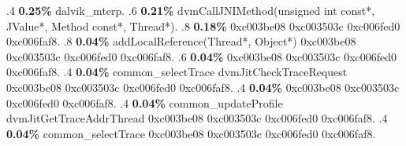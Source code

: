 \begin{profile}
{.4 \textbf{0.25\%} dalvik\_mterp. 
.6 \textbf{0.21\%} dvmCallJNIMethod(unsigned int const*, JValue*, Method const*, Thread*). 
.8 \textbf{0.18\%} 0xc003be08\newline {} 0xc003503c\newline {} 0xc006fed0\newline {} 0xc006faf8. 
.8 \textbf{0.04\%} addLocalReference(Thread*, Object*)\newline {} 0xc003be08\newline {} 0xc003503c\newline {} 0xc006fed0\newline {} 0xc006faf8. 
.6 \textbf{0.04\%} 0xc003be08\newline {} 0xc003503c\newline {} 0xc006fed0\newline {} 0xc006faf8. 
.4 \textbf{0.04\%} common\_selectTrace\newline {} dvmJitCheckTraceRequest\newline {} 0xc003be08\newline {} 0xc003503c\newline {} 0xc006fed0\newline {} 0xc006faf8. 
.4 \textbf{0.04\%} 0xc003be08\newline {} 0xc003503c\newline {} 0xc006fed0\newline {} 0xc006faf8. 
.4 \textbf{0.04\%} common\_updateProfile\newline {} dvmJitGetTraceAddrThread\newline {} 0xc003be08\newline {} 0xc003503c\newline {} 0xc006fed0\newline {} 0xc006faf8. 
.4 \textbf{0.04\%} common\_selectTrace\newline {} 0xc003be08\newline {} 0xc003503c\newline {} 0xc006fed0\newline {} 0xc006faf8. 
}
\end{profile}
